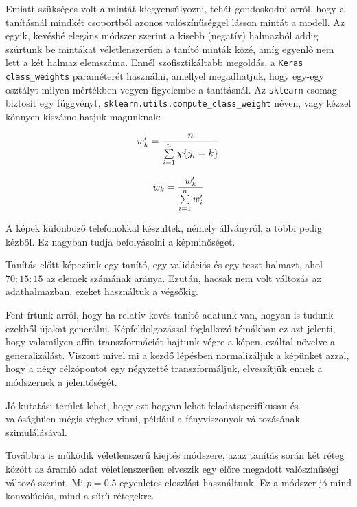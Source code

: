 Emiatt szükséges volt a mintát kiegyensúlyozni, tehát gondoskodni arról,
hogy a tanításnál mindkét csoportból azonos valószínűséggel lásson mintát 
a modell. Az egyik, kevésbé elegáns módszer szerint a kisebb (negatív) 
halmazból addig szúrtunk be mintákat véletlenszerűen a tanító minták közé, 
amíg egyenlő nem lett a két halmaz elemszáma.
Ennél szofisztikáltabb megoldás, a \texttt{Keras} \texttt{class\_weights} paraméterét
használni, amellyel megadhatjuk, hogy egy-egy osztályt milyen mértékben vegyen 
figyelembe a tanításnál. Az \texttt{sklearn} csomag biztosít egy függvényt,
\texttt{sklearn.utils.compute\_class\_weight} néven, vagy kézzel könnyen kiszámolhatjuk 
magunknak:

\[  w_k' =  \dfrac{n}{ \sum\limits_{{i}=1}^{n} \chi\{y_i = k\}}   \]

\[  w_k =  \dfrac{w_k'}{\sum\limits_{{i}=1}^{n} w_i'}  \]


A képek különböző telefonokkal készültek, némely állványról, a többi pedig kézből.
Ez nagyban tudja befolyásolni a képminőséget.


Tanítás előtt képezünk egy tanító, egy validációs és egy teszt halmazt, ahol 
$ 70:15:15 $ az elemek számának aránya. Ezután, hacsak nem volt változás az adathalmazban,
ezeket használtuk a végsőkig.





Fent írtunk arról, hogy ha relatív kevés tanító adatunk van, hogyan is tudunk
ezekből újakat generálni. Képfeldolgozással foglalkozó témákban ez azt jelenti,
hogy valamilyen affin transzformációt hajtunk végre a képen, ezáltal növelve a 
generalizálást. Viszont mivel mi a kezdő lépésben normalizáljuk a képünket azzal,
hogy a négy célzópontot egy négyzetté transzformáljuk, elveszítjük ennek a módszernek
a jelentőségét.


Jó kutatási terület lehet, hogy ezt hogyan lehet feladatspecifikusan és valósághűen 
mégis véghez vinni, például a fényviszonyok változásának szimulálásával.


Továbbra is működik véletlenszerű kiejtés módszere,
azaz tanítás során két réteg között az áramló adat véletlenszerűen elveszik
egy előre megadott valószínűségi változó szerint. Mi $ p=0.5 $ egyenletes 
eloszlást használtunk. Ez a módszer jó mind konvolúciós, mind a sűrű rétegekre.



